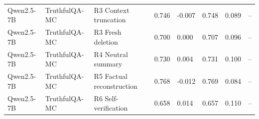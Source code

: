 \begin{table}
\begin{tabular}{llllllll}
Qwen2.5-7B & TruthfulQA-MC & R3 Context truncation & 0.746 & -0.007 & 0.748 & 0.089 & -- \\
Qwen2.5-7B & TruthfulQA-MC & R3 Fresh deletion & 0.700 & 0.000 & 0.707 & 0.096 & -- \\
Qwen2.5-7B & TruthfulQA-MC & R4 Neutral summary & 0.730 & 0.004 & 0.731 & 0.100 & -- \\
Qwen2.5-7B & TruthfulQA-MC & R5 Factual reconstruction & 0.768 & -0.012 & 0.769 & 0.084 & -- \\
Qwen2.5-7B & TruthfulQA-MC & R6 Self-verification & 0.658 & 0.014 & 0.657 & 0.110 & -- \\
\bottomrule
\end{tabular}
\end{table}

